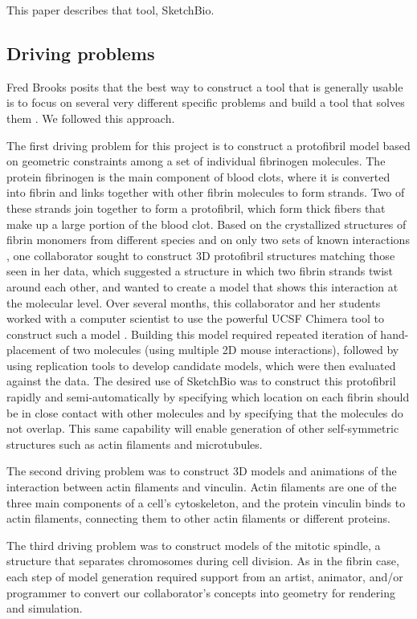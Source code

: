 \documentclass[twocolumn]{bmcart}%
\begin{document}
This paper describes that tool, SketchBio.

\subsection*{Driving problems}
Fred Brooks posits that the best way to construct a tool that is generally usable is to focus on several very different specific problems and build a tool that solves them \cite{Brooks}.
We followed this approach.

The first driving problem for this project is to construct a protofibril model based on geometric constraints among a set of individual fibrinogen molecules.
The protein fibrinogen is the main component of blood clots, where it is converted into fibrin and links together with other fibrin molecules to form strands.
Two of these strands join together to form a protofibril, which form thick fibers that make up a large portion of the blood clot.
Based on the crystallized structures of fibrin monomers from different species and on only two sets of known interactions \cite{lord2007fibrinogen}, one collaborator sought to construct 3D protofibril structures matching those seen in her data, which suggested a structure in which two fibrin strands twist around each other, and wanted to create a model that shows this interaction at the molecular level.
Over several months, this collaborator and her students worked with a computer scientist to use the powerful UCSF Chimera tool to construct such a model \cite{lordSubmitted}.
Building this model required repeated iteration of hand-placement of two molecules (using multiple 2D mouse interactions), followed by using replication tools to develop candidate models, which were then evaluated against the data.
The desired use of SketchBio was to construct this protofibril rapidly and semi-automatically by specifying which location on each fibrin should be in close contact with other molecules and by specifying that the molecules do not overlap.
This same capability will enable generation of other self-symmetric structures such as actin filaments and microtubules.

The second driving problem was to construct 3D models and animations of the interaction between actin filaments and vinculin.
Actin filaments are one of the three main components of a cell's cytoskeleton, and the protein vinculin binds to actin filaments, connecting them to other actin filaments or different proteins.

The third driving problem was to construct models of the mitotic spindle, a structure that separates chromosomes during cell division.
As in the fibrin case, each step of model generation required support from an artist, animator, and/or programmer to convert our collaborator's concepts into geometry for rendering and simulation.
\end{document}
